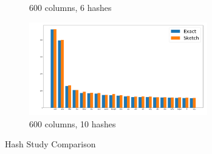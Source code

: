 \documentclass[shortpaper]{revdetua}
\begin{document}
\begin{figure}[ht]
\begin{subfigure}[t]{0.5\textwidth}
        \caption{600 columns, 6 hashes}
    \end{subfigure}
    \begin{subfigure}[t]{0.5\textwidth}
        \includegraphics[height=1.6in]{englishAlice600_10.png}
        \caption{600 columns, 10 hashes}
    \end{subfigure}
    \caption{Hash Study Comparison}
    \label{fig:hashSketchComp}
\end{figure}
\end{document}
